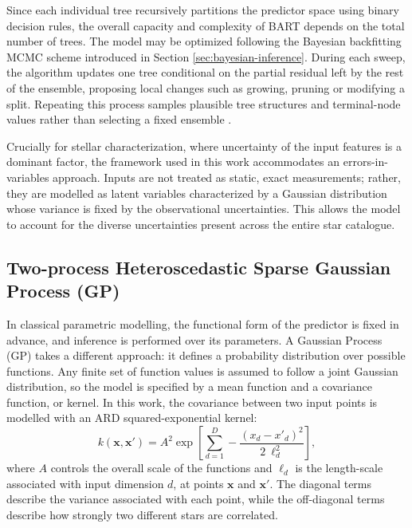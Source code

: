 
Since each individual tree recursively partitions the predictor space using binary decision rules, the overall capacity and complexity of BART depends on the total number of trees. The model may be optimized following the Bayesian backfitting MCMC scheme introduced in Section \ref{sec:bayesian-inference}. During each sweep, the algorithm updates one tree conditional on the partial residual left by the rest of the ensemble, proposing local changes such as growing, pruning or modifying a split. Repeating this process samples plausible tree structures and terminal-node values rather than selecting a fixed ensemble \citep{chipman2010bart}.

Crucially for stellar characterization, where uncertainty of the input features is a dominant factor, the framework used in this work accommodates an errors-in-variables approach. Inputs are not treated as static, exact measurements; rather, they are modelled as latent variables characterized by a Gaussian distribution whose variance is fixed by the observational uncertainties. This allows the model to account for the diverse uncertainties present across the entire star catalogue.



\subsection{Two-process Heteroscedastic Sparse Gaussian Process (GP)}

In classical parametric modelling, the functional form of the predictor is fixed in advance, and inference is performed over its parameters. A Gaussian Process (GP) takes a different approach: it defines a probability distribution over possible functions. Any finite set of function values is assumed to follow a joint Gaussian distribution, so the model is specified by a mean function and a covariance function, or kernel. In this work, the covariance between two input points is modelled with an ARD squared-exponential kernel:
\begin{equation}
k(\boldsymbol{x},\boldsymbol{x}')=
A^2
\exp\left[
\sum_{d=1}^{D}
-\frac{(x_{d}-x'_{d})^2}{2 \ \ell_d^2}
\right],
\end{equation}
where $A$ controls the overall scale of the functions and $\ell_d$ is the length-scale associated with input dimension $d$, at points $\boldsymbol{x}$ and $\boldsymbol{x}'$. The diagonal terms describe the variance associated with each point, while the off-diagonal terms describe how strongly two different stars are correlated.

